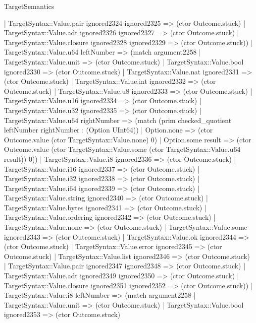\begin{lexlean}{TargetSemantics}
\begin{semanticmodule}
{              | TargetSyntax::Value.pair ignored2324 ignored2325 => (ctor Outcome.stuck)
              | TargetSyntax::Value.adt ignored2326 ignored2327 => (ctor Outcome.stuck)
              | TargetSyntax::Value.closure ignored2328 ignored2329 => (ctor Outcome.stuck))
            | TargetSyntax::Value.u64 leftNumber => (match argument2258
              | TargetSyntax::Value.unit => (ctor Outcome.stuck)
              | TargetSyntax::Value.bool ignored2330 => (ctor Outcome.stuck)
              | TargetSyntax::Value.nat ignored2331 => (ctor Outcome.stuck)
              | TargetSyntax::Value.int ignored2332 => (ctor Outcome.stuck)
              | TargetSyntax::Value.u8 ignored2333 => (ctor Outcome.stuck)
              | TargetSyntax::Value.u16 ignored2334 => (ctor Outcome.stuck)
              | TargetSyntax::Value.u32 ignored2335 => (ctor Outcome.stuck)
              | TargetSyntax::Value.u64 rightNumber => (match (prim checked_quotient leftNumber rightNumber : (Option UInt64))
                | Option.none => (ctor Outcome.value (ctor TargetSyntax::Value.none) 0)
                | Option.some result => (ctor Outcome.value (ctor TargetSyntax::Value.some (ctor TargetSyntax::Value.u64 result)) 0))
              | TargetSyntax::Value.i8 ignored2336 => (ctor Outcome.stuck)
              | TargetSyntax::Value.i16 ignored2337 => (ctor Outcome.stuck)
              | TargetSyntax::Value.i32 ignored2338 => (ctor Outcome.stuck)
              | TargetSyntax::Value.i64 ignored2339 => (ctor Outcome.stuck)
              | TargetSyntax::Value.string ignored2340 => (ctor Outcome.stuck)
              | TargetSyntax::Value.bytes ignored2341 => (ctor Outcome.stuck)
              | TargetSyntax::Value.ordering ignored2342 => (ctor Outcome.stuck)
              | TargetSyntax::Value.none => (ctor Outcome.stuck)
              | TargetSyntax::Value.some ignored2343 => (ctor Outcome.stuck)
              | TargetSyntax::Value.ok ignored2344 => (ctor Outcome.stuck)
              | TargetSyntax::Value.error ignored2345 => (ctor Outcome.stuck)
              | TargetSyntax::Value.list ignored2346 => (ctor Outcome.stuck)
              | TargetSyntax::Value.pair ignored2347 ignored2348 => (ctor Outcome.stuck)
              | TargetSyntax::Value.adt ignored2349 ignored2350 => (ctor Outcome.stuck)
              | TargetSyntax::Value.closure ignored2351 ignored2352 => (ctor Outcome.stuck))
            | TargetSyntax::Value.i8 leftNumber => (match argument2258
              | TargetSyntax::Value.unit => (ctor Outcome.stuck)
              | TargetSyntax::Value.bool ignored2353 => (ctor Outcome.stuck)
}
\end{semanticmodule}
\end{lexlean}
